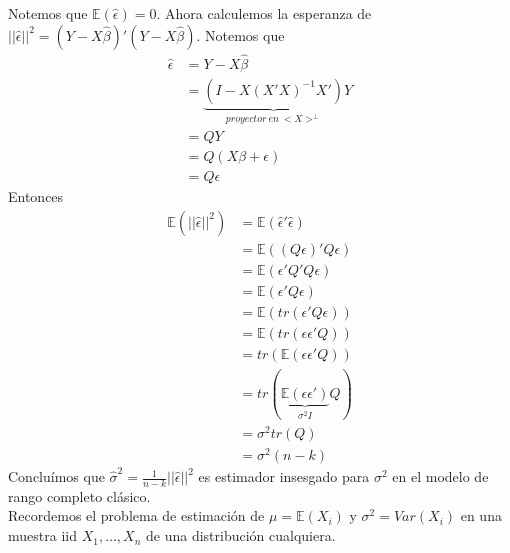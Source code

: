 \documentclass[10pt]{article}
\theoremstyle{plain}
\theoremstyle{definition}
\begin{document}
Notemos que $\mathbb{E}(\hat{\epsilon}) = 0$. Ahora calculemos la esperanza de $||\hat{\epsilon}||^2 = (Y-X\hat{\beta})'(Y-X\hat{\beta})$. Notemos que
\begin{align*}
\hat{\epsilon} &= Y -X \hat{\beta}\\
&= \underbrace{(I-X(X'X)^{-1}X')}_{proyector\ en\ <X>^{\perp}}Y\\
&= QY\\
&= Q(X\beta + \epsilon)\\
&= Q\epsilon
\end{align*}
Entonces
\begin{align*}
\mathbb{E}(||\hat{\epsilon}||^2) &= \mathbb{E}(\hat{\epsilon}'\hat{\epsilon})\\
&= \mathbb{E}((Q\epsilon)'Q\epsilon)\\
&= \mathbb{E}(\epsilon'Q'Q\epsilon)\\
&= \mathbb{E}(\epsilon'Q\epsilon)\\
&= \mathbb{E}(tr(\epsilon'Q\epsilon))\\
&= \mathbb{E}(tr(\epsilon\epsilon'Q))\\
&= tr(\mathbb{E}(\epsilon\epsilon'Q))\\
&= tr(\underbrace{\mathbb{E}(\epsilon\epsilon')}_{\sigma^2I}Q)\\
&= \sigma^2 tr(Q)\\
&= \sigma^2 (n-k)
\end{align*}
Concluímos que $\hat{\sigma}^2 = \frac{1}{n-k} ||\hat{\epsilon}||^2$ es estimador insesgado para $\sigma^2$ en el modelo de rango completo clásico.\\

Recordemos el problema de estimación de $\mu = \mathbb{E}(X_{i})$ y $\sigma^2 = Var(X_{i})$ en una muestra iid $X_{1},\ldots, X_{n}$ de una distribución cualquiera.\\
\end{document}
